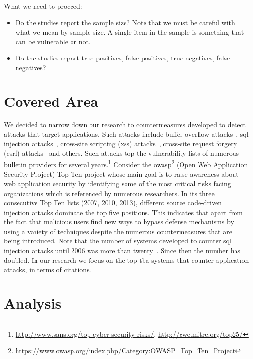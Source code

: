 \documentclass[conference]{IEEEtran}
\begin{document}
What we need to proceed:
\begin{itemize}
\item Do the studies report the sample size? Note that we must be
  careful with what we mean by sample size. A single item in the
  sample is something that can be vulnerable or not. 
\item Do the studies report true positives, false positives, true
  negatives, false negatives?
\end{itemize}


\section{Covered Area}

We decided to narrow down our
research to countermeasures developed to
detect attacks that target applications. Such attacks include
buffer overflow attacks~\cite{K11}, {\sc sql} injection
attacks~\cite{RL12b}, cross-site scripting ({\sc xss})
attacks~\cite{SG07}, cross-site request forgery ({\sc csrf})
attacks~\cite{LZRL09} and others.
Such attacks top the vulnerability lists of numerous bulletin providers for several
years.\footnote{\url{http://www.sans.org/top-cyber-security-risks/}, \url{http://cwe.mitre.org/top25/}}
Consider the {\sc owasp}\footnote{\url{https://www.owasp.org/index.php/Category:OWASP_Top_Ten_Project}}
(Open Web Application Security Project)
Top Ten project whose main goal is to raise awareness about
web application security by identifying some of the most critical risks facing
organizations which is referenced by numerous researchers.
In its three consecutive Top Ten lists (2007, 2010, 2013), different
source code-driven injection attacks dominate the top five positions.
This indicates that
apart from the fact that malicious users find new ways to bypass
defense mechanisms by using a variety of techniques despite the numerous
countermeasures that are being introduced.
Note that the number of systems developed to counter {\sc sql}
injection attacks until 2006 was more than twenty~\cite{HVO06}.
Since then the number has doubled.
In our research we focus on the top {\sc tba} systems that counter
application attacks, in terms of citations.

\section{Analysis}
\end{document}
